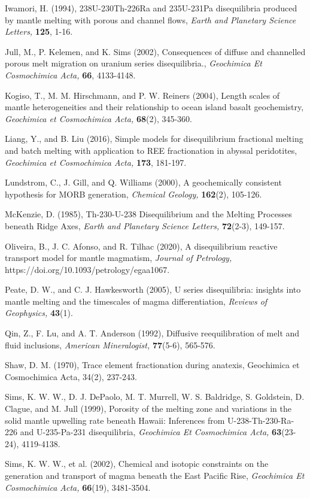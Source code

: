 \documentclass[11pt]{article}
\begin{document}
Iwamori, H. (1994), 238U-230Th-226Ra and 235U-231Pa disequilibria
produced by mantle melting with porous and channel flows, \emph{Earth
and Planetary Science Letters,} \textbf{125}, 1-16.

Jull, M., P. Kelemen, and K. Sims (2002), Consequences of diffuse and
channelled porous melt migration on uranium series disequilibria.,
\emph{Geochimica Et Cosmochimica Acta,} \textbf{66}, 4133-4148.

Kogiso, T., M. M. Hirschmann, and P. W. Reiners (2004), Length scales of
mantle heterogeneities and their relationship to ocean island basalt
geochemistry, \emph{Geochimica et Cosmochimica Acta,} \textbf{68}(2),
345-360.

Liang, Y., and B. Liu (2016), Simple models for disequilibrium
fractional melting and batch melting with application to REE
fractionation in abyssal peridotites, \emph{Geochimica et Cosmochimica
Acta,} \textbf{173}, 181-197.

Lundstrom, C., J. Gill, and Q. Williams (2000), A geochemically
consistent hypothesis for MORB generation, \emph{Chemical Geology,}
\textbf{162}(2), 105-126.

McKenzie, D. (1985), Th-230-U-238 Disequilibrium and the Melting
Processes beneath Ridge Axes, \emph{Earth and Planetary Science
Letters,} \textbf{72}(2-3), 149-157.

Oliveira, B., J. C. Afonso, and R. Tilhac (2020), A disequilibrium
reactive transport model for mantle magmatism, \emph{Journal of
Petrology,} https://doi.org/10.1093/petrology/egaa1067.

Peate, D. W., and C. J. Hawkesworth (2005), U series disequilibria:
insights into mantle melting and the timescales of magma
differentiation, \emph{Reviews of Geophysics,} \textbf{43}(1).

Qin, Z., F. Lu, and A. T. Anderson (1992), Diffusive reequilibration of
melt and fluid inclusions, \emph{American Mineralogist,}
\textbf{77}(5-6), 565-576.

Shaw, D. M. (1970), Trace element fractionation during anatexis,
Geochimica et Cosmochimica Acta, 34(2), 237-243.

Sims, K. W. W., D. J. DePaolo, M. T. Murrell, W. S. Baldridge, S.
Goldstein, D. Clague, and M. Jull (1999), Porosity of the melting zone
and variations in the solid mantle upwelling rate beneath Hawaii:
Inferences from U-238-Th-230-Ra-226 and U-235-Pa-231 disequilibria,
\emph{Geochimica Et Cosmochimica Acta,} \textbf{63}(23-24), 4119-4138.

Sims, K. W. W., et al. (2002), Chemical and isotopic constraints on the
generation and transport of magma beneath the East Pacific Rise,
\emph{Geochimica Et Cosmochimica Acta,} \textbf{66}(19), 3481-3504.
\end{document}

